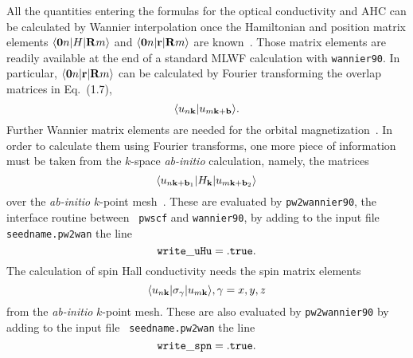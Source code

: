 
All the quantities entering the formulas for the optical conductivity
and AHC can be calculated by Wannier interpolation once the
Hamiltonian and position matrix elements $\langle {\bf 0}n\vert H\vert
{\bf R}m\rangle$ and $\langle {\bf 0}n\vert {\bf r}\vert {\bf
  R}m\rangle$ are known~\cite{wang-prb06,yates-prb07}.  Those matrix
elements are readily available at the end of a standard MLWF
calculation with {\tt wannier90}. In particular, $\langle {\bf
  0}n\vert {\bf r}\vert {\bf R}m\rangle$ can be calculated by Fourier
transforming the overlap matrices in Eq.~(1.7),
%
$$\langle u_{n{\bf k}}\vert u_{m{\bf k}+{\bf b}}\rangle.
$$
%
Further Wannier matrix elements are needed for the orbital
magnetization~\cite{lopez-prb12}. In order to calculate them using
Fourier transforms, one more piece of information must be taken from
the $k$-space {\it ab-initio} calculation, namely, the matrices
%
$$\langle u_{n{\bf k}+{\bf b}_1}\vert
H_{\bf k}\vert u_{m{\bf k}+{\bf b}_2}\rangle
$$
%
over the {\it ab-initio} $k$-point mesh~\cite{lopez-prb12}.  These are
evaluated by {\tt pw2wannier90}, the interface routine between {\tt
  pwscf} and {\tt wannier90}, by adding to the input file {\tt
  seedname.pw2wan} the line
%
$${\tt
write\_uHu = .true.
}
$$
The calculation of spin Hall conductivity needs the 
spin matrix elements
%
$$\langle u_{n{\bf k}}\vert \sigma_\gamma \vert u_{m{\bf k}}\rangle, 
\gamma = x, y, z
$$
% 
from the {\it ab-initio} $k$-point mesh. These are also 
evaluated by {\tt pw2wannier90} by adding to the input file {\tt
seedname.pw2wan} the line
%
$${\tt
	write\_spn = .true.
}
$$
 


